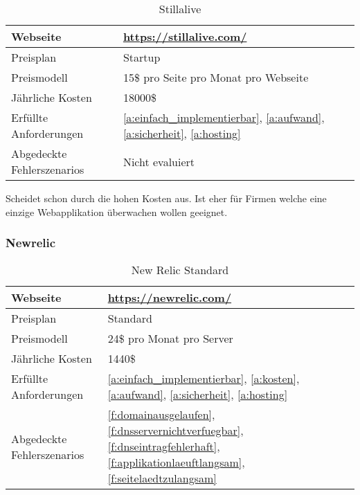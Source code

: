 \begin{table}[H]
  \centering
  \begin{tabular}{p{5cm} p{7cm}}
  \toprule
    Webseite & \url{https://stillalive.com/}\\
  \hline
    Preisplan & Startup\\
  \hline
    Preismodell & 15\$ pro Seite pro Monat pro Webseite\\
  \hline
    Jährliche Kosten & 18000\$\\
  \hline
    Erfüllte Anforderungen & \ref{a:einfach_implementierbar}, \ref{a:aufwand}, \ref{a:sicherheit}, \ref{a:hosting}\\
  \hline
    Abgedeckte Fehlerszenarios & Nicht evaluiert\\
  \bottomrule
  \end{tabular}
  \caption{Stillalive}
  \label{tab:stillalive}
\end{table}

Scheidet schon durch die hohen Kosten aus. Ist eher für Firmen welche eine einzige Webapplikation überwachen wollen geeignet.

\subsubsection{Newrelic}
\label{ssub:newrelic}

\begin{table}[H]
  \centering
  \begin{tabular}{p{5cm} p{7cm}}
  \toprule
    Webseite & \url{https://newrelic.com/}\\
  \hline
    Preisplan & Standard\\
  \hline
    Preismodell & 24\$ pro Monat pro Server\\
  \hline
    Jährliche Kosten & 1440\$\\
  \hline
    Erfüllte Anforderungen & \ref{a:einfach_implementierbar}, \ref{a:kosten}, \ref{a:aufwand}, \ref{a:sicherheit}, \ref{a:hosting}\\
  \hline
    Abgedeckte Fehlerszenarios & \ref{f:domainausgelaufen}, \ref{f:dnsservernichtverfuegbar}, \ref{f:dnseintragfehlerhaft}, \ref{f:applikationlaeuftlangsam}, \ref{f:seitelaedtzulangsam}\\
  \bottomrule
  \end{tabular}
  \caption{New Relic Standard}
  \label{tab:new_relic_standard}
\end{table}

